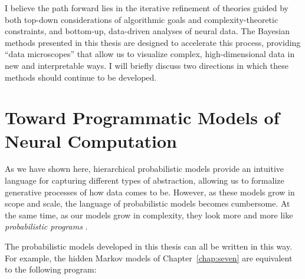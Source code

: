 
I believe the path forward lies in the iterative refinement of
theories guided by both top-down considerations of algorithmic goals
and complexity-theoretic constraints, and bottom-up, data-driven
analyses of neural data. The Bayesian methods presented in this thesis
are designed to accelerate this process, providing ``data
microscopes'' that allow us to visualize complex, high-dimensional
data in new and interpretable ways. I will briefly discuss two
directions in which these methods should continue to be developed.

\section{Toward Programmatic Models of Neural Computation}
As we have
shown here, hierarchical probabilistic models provide an intuitive
language for capturing different types of abstraction, allowing us to
formalize generative processes of how data comes to be. However, as
these models grow in scope and scale, the language of probabilistic
models becomes cumbersome. At the same time, as our models grow in
complexity, they look more and more like \emph{probabilistic
  programs} \citep{goodman2008church}.

The probabilistic models developed in this thesis can all be written in
this way. For example, the hidden Markov models of
Chapter~\ref{chap:seven} are equivalent to the following program:

